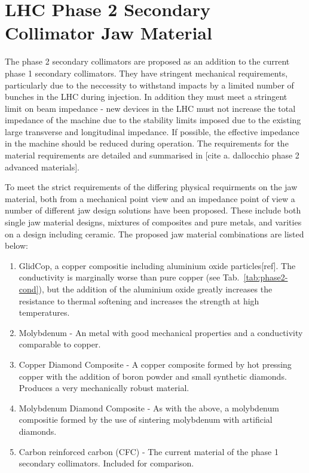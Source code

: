\section{LHC Phase 2 Secondary Collimator Jaw Material}

The phase 2 secondary collimators are proposed as an addition to the current phase 1 secondary collimators. They have stringent mechanical requirements, particularly due to the neccessity to withstand impacts by a limited number of bunches in the LHC during injection. In addition they must meet a stringent limit on beam impedance - new devices in the LHC must not increase the total impedance of the machine due to the stability limits imposed due to the existing large transverse and longitudinal impedance. If possible, the effective impedance in the machine should be reduced during operation. The requirements for the material requirements are detailed and summarised in [cite a. dallocchio phase 2 advanced materials].

To meet the strict requirements of the differing physical requirments on the jaw material, both from a mechanical point view and an impedance point of view a number of different jaw design solutions have been proposed. These include both single jaw material designs, mixtures of composites and pure metals, and varities on a design including ceramic. The proposed jaw material combinations are listed below:

\begin{enumerate}
\item{GlidCop, a copper compositie including aluminium oxide particles[ref]. The conductivity is marginally worse than pure copper (see Tab.~\ref{tab:phase2-cond}), but the addition of the aluminium oxide greatly increases the resistance to thermal softening and increases the strength at high temperatures.}
\item{Molybdenum - An metal with good mechanical properties and a conductivity comparable to copper.}
\item{Copper Diamond Composite - A copper composite formed by hot pressing copper with the addition of boron powder and small synthetic diamonds. Produces a very mechanically robust material.}
\item{Molybdenum Diamond Composite - As with the above, a molybdenum compositie formed by the use of sintering molybdenum with artificial diamonds.}
\item{Carbon reinforced carbon (CFC) - The current material of the phase 1 secondary collimators. Included for comparison.}
\end{enumerate}

